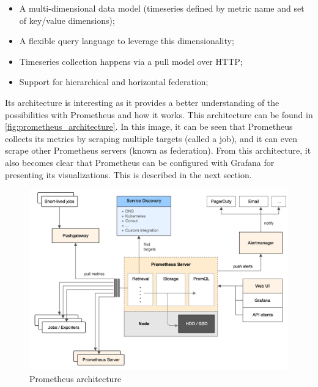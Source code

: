 \begin{itemize}
    \item A multi-dimensional data model (timeseries defined by metric name and set of key/value dimensions);
    \item A flexible query language to leverage this dimensionality;
    \item Timeseries collection happens via a pull model over HTTP;
    \item Support for hierarchical and horizontal federation;
\end{itemize}
    
Its architecture is interesting as it provides a better understanding of the possibilities with Prometheus and how it works. This architecture can be found in \autoref{fig:prometheus_architecture}. In this image, it can be seen that Prometheus collects its metrics by scraping multiple targets (called a job), and it can even scrape other Prometheus servers (known as federation). From this architecture, it also becomes clear that Prometheus can be configured with Grafana for presenting its visualizations. This is described in the next section.\\

\begin{figure}
    \centering
    \includegraphics[width=\textwidth]{gfx/prometheus_architecture.png}
    \caption{Prometheus architecture}
    \label{fig:prometheus_architecture}
\end{figure}

